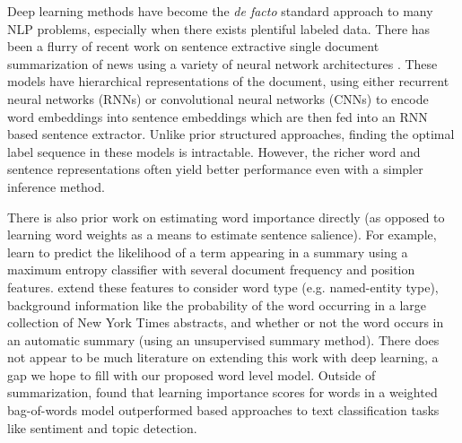 Deep learning methods have become the \textit{de facto} standard approach to many 
NLP problems, especially when there exists plentiful labeled data.
There has been a flurry of recent work on sentence extractive 
single document summarization of news using a variety of neural network 
architectures 
\citep{cheng2016neural,nallapati2016classify,nallapati2016summarunner,narayan2018ranking}.
These models have hierarchical representations of the document, using
either
recurrent neural networks (RNNs) or convolutional neural networks (CNNs)
to encode word embeddings into sentence embeddings which are then fed into
an RNN based sentence extractor. 
Unlike prior structured approaches,
finding the optimal label sequence in these models is intractable. However,
the richer word and sentence representations often yield better performance
even with a simpler inference method. 








There is also prior  work on estimating word importance directly 
(as opposed to learning word weights as a means to estimate sentence salience).
For example, \cite{yih2007multi} learn to predict the likelihood
of a term appearing in a summary using a maximum entropy classifier with
several document frequency and position features. \cite{hong2014improving}
extend these features to consider word type (e.g. named-entity type),
background information like the probability of the word occurring 
in a large collection of New York Times abstracts, and whether or
not the word occurs in an automatic summary (using an unsupervised summary
method). There does not appear to be much literature on extending this work
with deep learning, a gap we hope to fill with our proposed word level model. 
Outside of summarization,
\cite{sheikh2016learning} found that learning importance scores for 
words in a weighted bag-of-words model outperformed \tfidf{} based approaches
to text classification tasks like 
sentiment and topic detection. 
 


 
